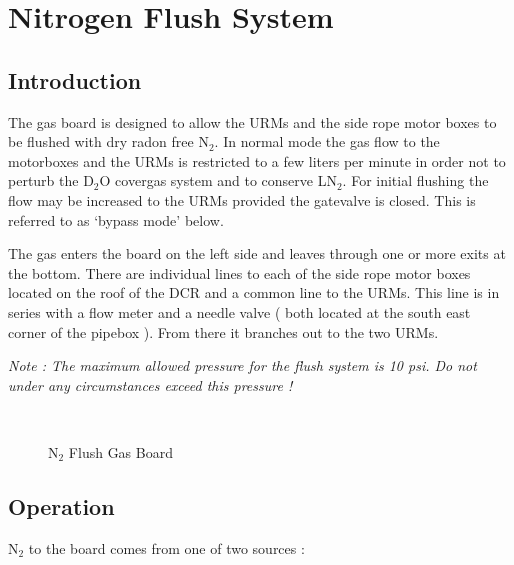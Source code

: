   
\clearpage
\section{Nitrogen Flush System}
  
\subsection{Introduction}  

  The gas board is designed to allow the URMs and the side rope motor boxes
to be flushed with dry  radon free N$_2$. In normal mode  the gas flow to the
motorboxes and the URMs is restricted to a few liters per minute in order
not to perturb the D$_2$O covergas system and to conserve LN$_2$. For initial
flushing the flow may be increased to the URMs provided the gatevalve is closed.
This is referred to as `bypass mode' below.

 The gas enters the board on the left side and leaves through one or more exits
at the bottom. There are individual lines to each of the side rope motor boxes
located on the roof of the DCR and a common line to the URMs. This line is 
in series with a flow meter and a needle valve ( both located at the south 
east corner of the pipebox ). From there it branches out to the two URMs.


 
 {\em Note : The maximum allowed pressure for the flush system is 10 psi.
Do not under any circumstances exceed this pressure ! }

 


\begin{figure}[htb]
\begin{center}
\leavevmode
\epsfxsize=7in
~\\
\caption[DCR Flush System]
        {N$_2$ Flush Gas Board
        }
\end{center}
\end{figure}

\subsection{Operation}

  N$_2$ to the board comes from one of two sources :

